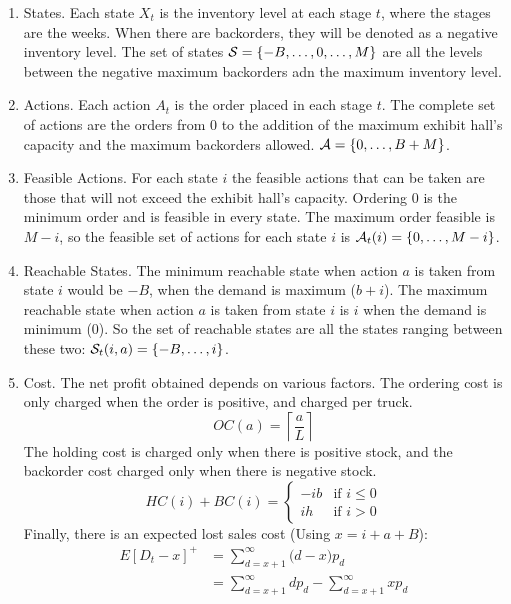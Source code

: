 \documentclass[11pt]{article}
\newcommand {\cA}{\ensuremath \mathcal{A}}
\newcommand {\cS}{\ensuremath \mathcal{S}}
\begin{document}
\begin{enumerate}
  \item States. Each state $X_t$ is the inventory level at each stage $t$, where the stages are the weeks. When there are backorders, they will be denoted as a negative inventory level. The set of states $\cS = \{-B, \ldots, 0, \ldots, M  \}$ are all the levels between the negative maximum backorders adn the maximum inventory level.
  \item Actions. Each action $A_t$ is the order placed in each stage $t$. The complete set of actions are the orders from 0 to the addition of the maximum exhibit hall's capacity and the maximum backorders allowed. $\cA = \{0,\ldots,B+M\}$.
  \item Feasible Actions. For each state $i$ the feasible actions that can be taken are those that will not exceed the exhibit hall's capacity. Ordering 0 is the minimum order and is feasible in every state. The maximum order feasible is $M-i$, so the feasible set of actions for each state $i$ is $\cA_t(i) =\{0,\ldots,M-i\}$.
  \item Reachable States. The minimum reachable state when action $a$ is taken from state $i$ would be $-B$, when the demand is maximum ($b+i$). The maximum reachable state when action $a$ is taken from state $i$ is $i$ when the demand is minimum (0). So the set of reachable states are all the states ranging between these two: $\cS_t(i,a) = \{-B, \ldots, i\}$.
  \item Cost. The net profit obtained depends on various factors. The ordering cost is only charged when the order is positive, and charged per truck.
  \begin{equation*}
    OC(a)=  \left\lceil \frac{a}{L}\right\rceil
  \end{equation*}
  The holding cost is charged only when there is positive stock, and the backorder cost charged only when there is negative stock.
  \begin{equation*}HC(i)+BC(i)=\left\{
    \begin{array}{cc}
      -ib & \textrm{if $i \le 0$}\\
      ih & \textrm{if $i > 0$}
    \end{array} \right.
  \end{equation*}
  Finally, there is an expected lost sales cost (Using $x=i+a+B$):
    \begin{align*}
      E[D_t-x]^+ &= \sum_{d=x+1}^\infty \big(d-x\big)p_d \\
      &= \sum_{d=x+1}^\infty dp_d -\sum_{d=x+1}^\infty xp_d \\

\end{align*}
\end{enumerate}
\end{document}
